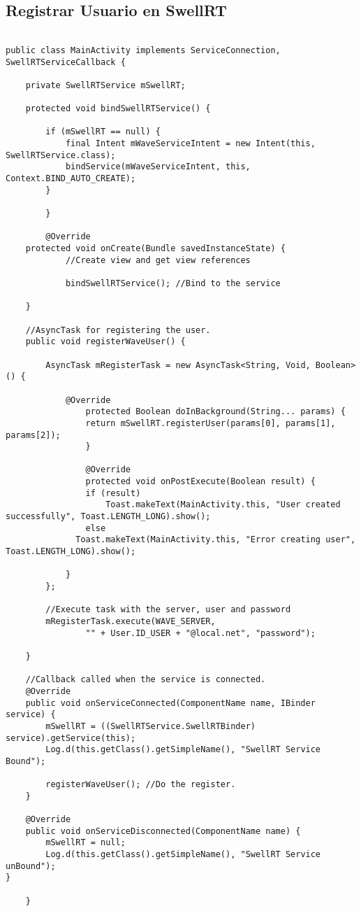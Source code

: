 \subsection{Registrar Usuario en SwellRT} \label{ssec:waveRegister}

	  \begin{lstlisting}[frame=single]
	  
public class MainActivity implements ServiceConnection, SwellRTServiceCallback {
	  
	private SwellRTService mSwellRT;	  
	  
	protected void bindSwellRTService() {

        if (mSwellRT == null) {
            final Intent mWaveServiceIntent = new Intent(this, SwellRTService.class);
            bindService(mWaveServiceIntent, this, Context.BIND_AUTO_CREATE);
        }

    	}
    		
    	@Override
    protected void onCreate(Bundle savedInstanceState) {
    		//Create view and get view references
    		
    		bindSwellRTService(); //Bind to the service
    		
    }
    
    //AsyncTask for registering the user.
    public void registerWaveUser() {

        AsyncTask mRegisterTask = new AsyncTask<String, Void, Boolean>() {

       		@Override
        		protected Boolean doInBackground(String... params) {
           		return mSwellRT.registerUser(params[0], params[1], params[2]);
        		}

        		@Override
        		protected void onPostExecute(Boolean result) {
          		if (result)
              		Toast.makeText(MainActivity.this, "User created successfully", Toast.LENGTH_LONG).show();
           		else
              Toast.makeText(MainActivity.this, "Error creating user", Toast.LENGTH_LONG).show();

            }
        };
		
		//Execute task with the server, user and password
        mRegisterTask.execute(WAVE_SERVER,
                "" + User.ID_USER + "@local.net", "password");

    }

	//Callback called when the service is connected.
    @Override
    public void onServiceConnected(ComponentName name, IBinder service) {
        mSwellRT = ((SwellRTService.SwellRTBinder) service).getService(this);
        Log.d(this.getClass().getSimpleName(), "SwellRT Service Bound");
        
        registerWaveUser(); //Do the register.
    }

    @Override
    public void onServiceDisconnected(ComponentName name) {
        mSwellRT = null;
        Log.d(this.getClass().getSimpleName(), "SwellRT Service unBound");
}	
    
    }
    
	  \end{lstlisting}
	  

